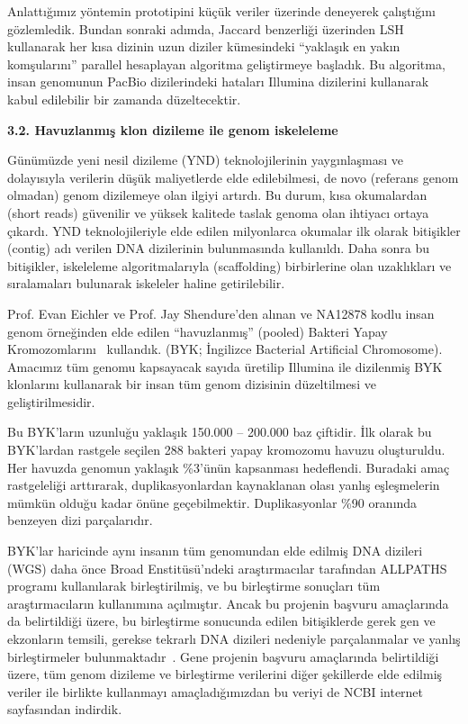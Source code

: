\documentclass[11pt]{article}
\begin{document}
Anlattığımız yöntemin prototipini küçük veriler üzerinde deneyerek çalıştığını gözlemledik. Bundan sonraki adımda, Jaccard benzerliği üzerinden LSH kullanarak her kısa dizinin uzun diziler kümesindeki ``yaklaşık en yakın komşularını'' parallel hesaplayan algoritma geliştirmeye başladık. Bu algoritma, insan genomunun PacBio dizilerindeki hataları Illumina dizilerini kullanarak kabul edilebilir bir zamanda düzeltecektir.




{\bf \large 3.2. Havuzlanmış klon dizileme ile genom iskeleleme}


Günümüzde yeni nesil dizileme (YND) teknolojilerinin yaygınlaşması ve dolayısıyla verilerin düşük maliyetlerde elde edilebilmesi, de novo (referans genom olmadan) 
genom dizilemeye olan ilgiyi artırdı.
Bu durum, kısa okumalardan (short reads) güvenilir ve yüksek kalitede taslak genoma olan ihtiyacı ortaya çıkardı. YND teknolojileriyle elde edilen milyonlarca okumalar ilk olarak bitişikler (contig) adı verilen DNA dizilerinin bulunmasında kullanıldı. Daha sonra bu bitişikler, iskeleleme algoritmalarıyla (scaffolding) birbirlerine olan uzaklıkları ve sıralamaları bulunarak iskeleler haline getirilebilir.

Prof. Evan Eichler ve Prof. Jay Shendure'den alınan ve NA12878 kodlu insan genom örneğinden elde edilen ``havuzlanmış'' (pooled) Bakteri Yapay Kromozomlarını~\cite{Kitzman2011} kullandık. 
(BYK; İngilizce Bacterial Artificial Chromosome). 
Amacımız tüm genomu kapsayacak sayıda üretilip Illumina ile dizilenmiş BYK klonlarını kullanarak bir insan tüm genom dizisinin düzeltilmesi ve geliştirilmesidir.
	
Bu BYK’ların uzunluğu yaklaşık 150.000 – 200.000 baz çiftidir. İlk olarak bu BYK'lardan rastgele seçilen 288 bakteri yapay kromozomu havuzu oluşturuldu. Her havuzda genomun yaklaşık \%3'ünün 
kapsanması hedeflendi. Buradaki amaç rastgeleliği arttırarak, duplikasyonlardan kaynaklanan olası yanlış eşleşmelerin mümkün olduğu kadar önüne geçebilmektir. 
Duplikasyonlar \%90 oranında benzeyen dizi parçalarıdır. 

BYK’lar haricinde aynı insanın tüm genomundan elde edilmiş DNA dizileri (WGS) daha önce Broad Enstitüsü’ndeki araştırmacılar tarafından ALLPATHS~\cite{Gnerre2011} programı kullanılarak birleştirilmiş, ve bu birleştirme sonuçları tüm araştırmacıların kullanımına açılmıştır. Ancak bu projenin başvuru amaçlarında da belirtildiği üzere, bu birleştirme sonucunda edilen bitişiklerde gerek gen ve ekzonların temsili, gerekse tekrarlı DNA dizileri nedeniyle parçalanmalar ve yanlış birleştirmeler bulunmaktadır~\cite{Alkan2011b}. Gene projenin başvuru amaçlarında belirtildiği üzere, tüm genom dizileme ve birleştirme verilerini diğer şekillerde elde edilmiş veriler ile birlikte kullanmayı amaçladığımızdan bu veriyi de NCBI internet sayfasından indirdik.
\end{document}
